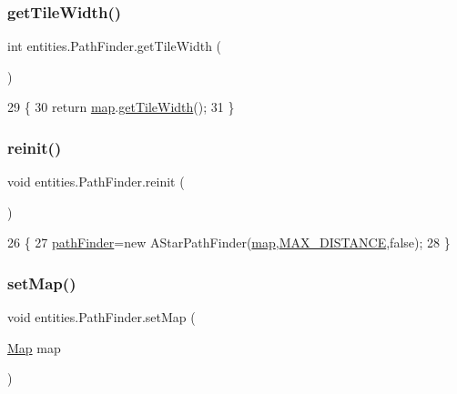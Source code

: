 \subsubsection{\texorpdfstring{get\+Tile\+Width()}{getTileWidth()}}
{\footnotesize\ttfamily int entities.\+Path\+Finder.\+get\+Tile\+Width (\begin{DoxyParamCaption}{ }\end{DoxyParamCaption})\hspace{0.3cm}{\ttfamily [inline]}}


\begin{DoxyCode}
29                          \{
30     \textcolor{keywordflow}{return} \mbox{\hyperlink{classentities_1_1_path_finder_a55024473615fc2ba75d7faf5dcd78b3f}{map}}.\mbox{\hyperlink{classentities_1_1_map_ada3d3610a5bdc025e1509583e0e36746}{getTileWidth}}();
31 \}
\end{DoxyCode}
\mbox{\label{classentities_1_1_path_finder_a43344b26144ea29f390b8be84f14ee7a}} 
\subsubsection{\texorpdfstring{reinit()}{reinit()}}
{\footnotesize\ttfamily void entities.\+Path\+Finder.\+reinit (\begin{DoxyParamCaption}{ }\end{DoxyParamCaption})\hspace{0.3cm}{\ttfamily [inline]}}


\begin{DoxyCode}
26                          \{
27         \mbox{\hyperlink{classentities_1_1_path_finder_a3ee55002f6ed410109207b43757e93f7}{pathFinder}}=\textcolor{keyword}{new} AStarPathFinder(\mbox{\hyperlink{classentities_1_1_path_finder_a55024473615fc2ba75d7faf5dcd78b3f}{map}},\mbox{\hyperlink{classentities_1_1_path_finder_a851c29b8b7dda1ff3488998c540dafc3}{MAX\_DISTANCE}},\textcolor{keyword}{false});
28     \}
\end{DoxyCode}
\mbox{\label{classentities_1_1_path_finder_a20d8d7bca113f2a92740b00fb5c8f6ee}} 
\subsubsection{\texorpdfstring{set\+Map()}{setMap()}}
{\footnotesize\ttfamily void entities.\+Path\+Finder.\+set\+Map (\begin{DoxyParamCaption}\item[{\mbox{\hyperlink{classentities_1_1_map}{Map}}}]{map }\end{DoxyParamCaption})\hspace{0.3cm}{\ttfamily [inline]}}


